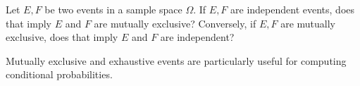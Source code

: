 \documentclass[../main.tex]{subfiles}
\begin{document}
\begin{example} 
  Let \(E,F\) be two events in a sample space \(\Omega\). If \(E,F\) are independent events, does that imply \(E\) and \(F\) are mutually exclusive?  Conversely, if \(E,F\) are mutually exclusive, does that imply \(E\) and \(F\) are independent?

\end{example}

Mutually exclusive and exhaustive events are particularly useful for computing conditional probabilities.  
\end{document}
